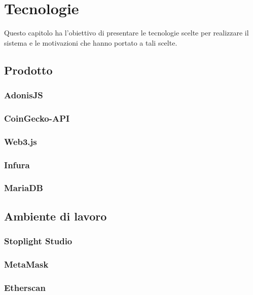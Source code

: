 
\chapter{Tecnologie}
\label{cap:tecnologie}
Questo capitolo ha l'obiettivo di presentare le tecnologie scelte per realizzare il sistema e le motivazioni che hanno portato a tali scelte.

\section{Prodotto}
    \subsection{AdonisJS}
    \subsection{CoinGecko-API}
    \subsection{Web3.js}
    \subsection{Infura}
    \subsection{MariaDB}

\section{Ambiente di lavoro}
    \subsection{Stoplight Studio}
    \subsection{MetaMask}
    \subsection{Etherscan}
